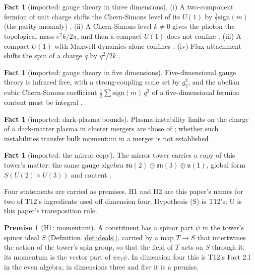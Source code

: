 \documentclass[11pt]{article}
\theoremstyle{definition}
\newtheorem{fact}[theorem]{Fact}
\newtheorem{premise}[theorem]{Premise}
\newcommand{\rev}[1]{\widetilde{#1}}
\newcommand{\su}{\mathfrak{su}}
\newcommand{\uu}{\mathfrak{u}}
\begin{document}
\begin{fact}[imported: gauge theory in three dimensions]\label{fact:threeD}
(i) A two-component fermion of unit charge shifts the Chern-Simons level of its $U(1)$ by $\tfrac{1}{2}\mathrm{sign}(m)$ (the parity anomaly) \cite{Redlich1984, NiemiSemenoff1983}. (ii) A Chern-Simons level $k \neq 0$ gives the photon the topological mass $e^{2}k/2\pi$, and then a compact $U(1)$ does not confine \cite{DJT1982, AHPS1989}. (iii) A compact $U(1)$ with Maxwell dynamics alone confines \cite{Polyakov1977}. (iv) Flux attachment shifts the spin of a charge $q$ by $q^{2}/2k$ \cite{Wilczek1982}.
\end{fact}

\begin{fact}[imported: gauge theory in five dimensions]\label{fact:fiveD}
Five-dimensional gauge theory is infrared free, with a strong-coupling scale set by $g_{5}^{2}$, and the abelian cubic Chern-Simons coefficient $\tfrac{1}{2}\sum \mathrm{sign}(m)\,q^{3}$ of a five-dimensional fermion content must be integral \cite{IMS1997, CLP2000}.
\end{fact}

\begin{fact}[imported: dark-plasma bounds]\label{fact:plasma}
Plasma-instability limits on the charge of a dark-matter plasma in cluster mergers are those of \cite{SSS2024, PIC2024}; whether such instabilities transfer bulk momentum in a merger is not established \cite{Lasenby2020}.
\end{fact}

\begin{fact}[imported: the mirror copy]\label{fact:mirrorcopy}
The mirror tower carries a copy of this tower's matter: the same gauge algebra $\su(2) \oplus \su(3) \oplus \uu(1)$, global form $S(U(2) \times U(3))$ and content \cite[Thm.~4.3]{ButlerT14}.
\end{fact}

Four statements are carried as premises. H1 and H2 are this paper's names for two of T12's ingredients used off dimension four; Hypothesis (S) is T12's; U is this paper's transposition rule.

\begin{premise}[H1: momentum]\label{prem:H1}
A constituent has a spinor part $\psi$ in the tower's spinor ideal $S$ (Definition \ref{def:ideals}), carried by a map $T \to S$ that intertwines the action of the tower's spin group, so that the field of $T$ acts on $S$ through it; its momentum is the vector part of $\psi e_{t}\rev{\psi}$. In dimension four this is T12's Fact 2.1 in the even algebra; in dimensions three and five it is a premise.
\end{premise}
\end{document}
